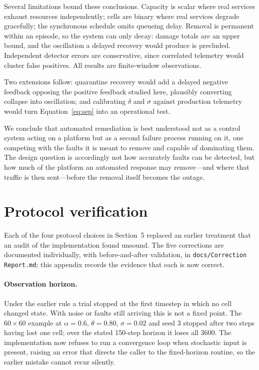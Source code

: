 \documentclass[11pt,a4paper]{article}
\begin{document}
Several limitations bound these conclusions. Capacity is scalar where real
services exhaust resources independently; cells are binary where real services
degrade gracefully; the synchronous schedule omits queueing delay. Removal is
permanent within an episode, so the system can only decay: damage totals are an
upper bound, and the oscillation a delayed recovery would produce is precluded.
Independent detector errors are conservative, since correlated telemetry would
cluster false positives. All results are finite-window observations.

Two extensions follow: quarantine recovery would add a delayed negative feedback
opposing the positive feedback studied here, plausibly converting collapse into
oscillation; and calibrating $\delta$ and $\sigma$ against production telemetry
would turn Equation~\ref{eq:sep} into an operational test.

We conclude that automated remediation is best understood not as a control
system acting on a platform but as a second failure process running on it, one
competing with the faults it is meant to remove and capable of dominating them.
The design question is accordingly not how accurately faults can be detected,
but how much of the platform an automated response may remove---and where that
traffic is then sent---before the removal itself becomes the outage.



\appendix
\section{Protocol verification}
\label{app:protocol}

Each of the four protocol choices in Section~5 replaced an earlier treatment
that an audit of the implementation found unsound. The five corrections are
documented individually, with before-and-after validation, in
\texttt{docs/Correction Report.md}; this appendix records the evidence that each
is now correct.

\paragraph{Observation horizon.}
Under the earlier rule a trial stopped at the first timestep in which no cell
changed state. With noise or faults still arriving this is not a fixed point.
The $60\times60$ example at $\alpha = 0.6$, $\theta = 0.80$, $\sigma = 0.02$ and
seed 3 stopped after two steps having lost one cell; over the stated 150-step
horizon it loses all 3600. The implementation now refuses to run a convergence
loop when stochastic input is present, raising an error that directs the caller
to the fixed-horizon routine, so the earlier mistake cannot recur silently.
\end{document}
